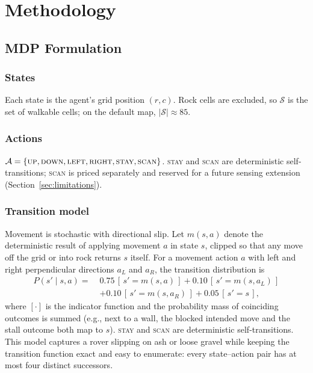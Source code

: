 \documentclass[conference]{IEEEtran}
\begin{document}
\section{Methodology}\label{sec:method}

\subsection{MDP Formulation}

\subsubsection{States} Each state is the agent's grid position $(r, c)$. Rock cells are excluded, so $\mathcal{S}$ is the set of walkable cells; on the default map, $|\mathcal{S}| \approx 85$.

\subsubsection{Actions} $\mathcal{A} = \{\textsc{up}, \textsc{down}, \textsc{left}, \textsc{right}, \textsc{stay}, \textsc{scan}\}$. \textsc{stay} and \textsc{scan} are deterministic self-transitions; \textsc{scan} is priced separately and reserved for a future sensing extension (Section~\ref{sec:limitations}).

\subsubsection{Transition model} Movement is stochastic with directional slip. Let $m(s, a)$ denote the deterministic result of applying movement $a$ in state $s$, clipped so that any move off the grid or into rock returns $s$ itself. For a movement action $a$ with left and right perpendicular directions $a_{L}$ and $a_{R}$, the transition distribution is
\begin{align}
  P(s' \mid s, a) = \; & 0.75\,[\,s' = m(s, a)\,] + 0.10\,[\,s' = m(s, a_{L})\,] \nonumber \\
  & + 0.10\,[\,s' = m(s, a_{R})\,] + 0.05\,[\,s' = s\,],
  \label{eq:transition}
\end{align}
where $[\cdot]$ is the indicator function and the probability mass of coinciding outcomes is summed (e.g., next to a wall, the blocked intended move and the stall outcome both map to $s$). \textsc{stay} and \textsc{scan} are deterministic self-transitions. This model captures a rover slipping on ash or loose gravel while keeping the transition function exact and easy to enumerate: every state--action pair has at most four distinct successors.
\end{document}
